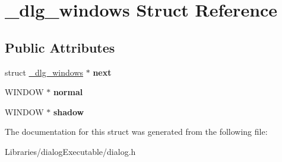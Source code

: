 \hypertarget{struct__dlg__windows}{}\section{\+\_\+dlg\+\_\+windows Struct Reference}
\label{struct__dlg__windows}
\subsection*{Public Attributes}
\begin{DoxyCompactItemize}
\item 
struct \hyperlink{struct__dlg__windows}{\+\_\+dlg\+\_\+windows} $\ast$ {\bfseries next}\hypertarget{struct__dlg__windows_a1ca7c8155f8ffac3c1e50f1bf7532d5a}{}\label{struct__dlg__windows_a1ca7c8155f8ffac3c1e50f1bf7532d5a}

\item 
W\+I\+N\+D\+OW $\ast$ {\bfseries normal}\hypertarget{struct__dlg__windows_ab506ba137680c2896f5e32777f2c9f81}{}\label{struct__dlg__windows_ab506ba137680c2896f5e32777f2c9f81}

\item 
W\+I\+N\+D\+OW $\ast$ {\bfseries shadow}\hypertarget{struct__dlg__windows_a64e16a0157f9fe27717509eefd7df8d9}{}\label{struct__dlg__windows_a64e16a0157f9fe27717509eefd7df8d9}

\end{DoxyCompactItemize}


The documentation for this struct was generated from the following file\+:\begin{DoxyCompactItemize}
\item 
Libraries/dialog\+Executable/dialog.\+h\end{DoxyCompactItemize}
